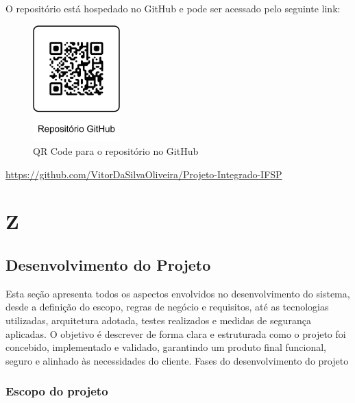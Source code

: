 \documentclass[
	12pt,				%
	openright,			%
	twoside,			%
	a4paper,			%
	english,			%
	french,				%
	spanish,			%
	brazil				%
	]{abntex2}
\begin{document}
O repositório está hospedado no GitHub e pode ser acessado pelo seguinte link:

\begin{figure}[h!]
    \centering
    \includegraphics[width=0.3\textwidth]{Figuras/QR-CODE-GitHub.png}
    \caption{QR Code para o repositório no GitHub}
    \label{fig:qrcode-github}
\end{figure}
\begin{center}
    \href{https://github.com/VitorDaSilvaOliveira/Projeto-Integrado-IFSP}{https://github.com/VitorDaSilvaOliveira/Projeto-Integrado-IFSP}
\end{center}




\part{Z}

\chapter{Desenvolvimento do Projeto}

Esta seção apresenta todos os aspectos envolvidos no desenvolvimento do sistema, desde a definição do escopo, regras de negócio e requisitos, até as tecnologias utilizadas, arquitetura adotada, testes realizados e medidas de segurança aplicadas. O objetivo é descrever de forma clara e estruturada como o projeto foi concebido, implementado e validado, garantindo um produto final funcional, seguro e alinhado às necessidades do cliente.
Fases do desenvolvimento do projeto
\section{Escopo do projeto}
\end{document}
